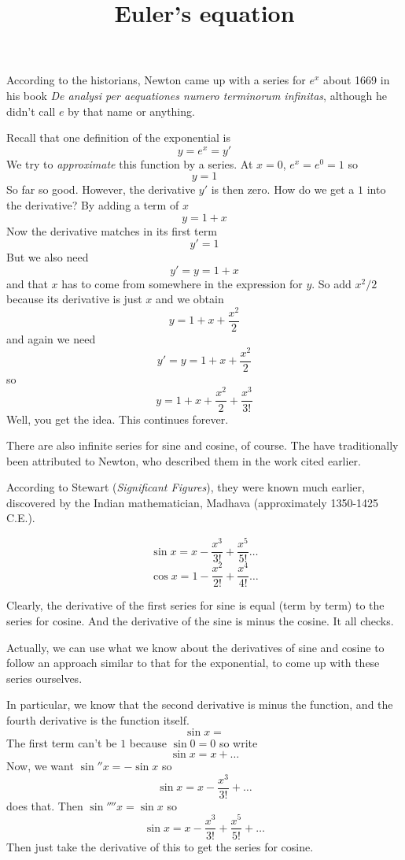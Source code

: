 \documentclass[11pt, oneside]{article}
\title{Euler's equation}
\date{}
\begin{document}
\maketitle
\Large


\label{sec:Euler_quickly}
According to the historians, Newton came up with a series for $e^x$ about 1669 in his book \emph{De analysi per aequationes numero terminorum infinitas}, although he didn't call $e$ by that name or anything.

Recall that one definition of the exponential is
\[ y = e^x = y'  \]
We try to \emph{approximate} this function by a series.  At $x = 0$, $e^x = e^0 = 1$ so
\[ y = 1 \]
So far so good.  However, the derivative $y'$ is then zero.  How do we get a $1$ into the derivative?  By adding a term of $x$
\[ y = 1 + x \]
Now the derivative matches in its first term
\[ y' = 1 \]
But we also need 
\[ y' = y = 1 + x \]
and that $x$ has to come from somewhere in the expression for $y$.  So add $x^2/2$ because its derivative is just $x$ and we obtain
\[ y = 1 + x + \frac{x^2}{2} \]
and again we need 
\[ y' = y = 1 + x + \frac{x^2}{2} \]
so
\[ y = 1 + x + \frac{x^2}{2} + \frac{x^3}{3!} \]
Well, you get the idea.  This continues forever.

There are also infinite series for sine and cosine, of course.  The have traditionally been attributed to Newton, who described them in the work cited earlier.

According to Stewart (\emph{Significant Figures}), they were known much earlier, discovered by the Indian mathematician, Madhava (approximately 1350-1425 C.E.).

\[ \sin x = x - \frac{x^3}{3!} + \frac{x^5}{5!} \dots \]
\[ \cos x = 1 - \frac{x^2}{2!} + \frac{x^4}{4!} \dots \]

Clearly, the derivative of the first series for sine is equal (term by term) to the series for cosine.  And the derivative of the sine is minus the cosine.  It all checks.

Actually, we can use what we know about the derivatives of sine and cosine to follow an approach similar to that for the exponential, to come up with these series ourselves. 

In particular, we know that the second derivative is minus the function, and the fourth derivative is the function itself.
\[ \sin x = \]
The first term can't be $1$ because $\sin 0 = 0$ so write
\[ \sin x = x + \dots \]
Now, we want $\sin'' x = - \sin x$ so
\[ \sin x = x - \frac{x^3}{3!} + \dots \]
does that.  Then $\sin'''' x = \sin x$ so
\[ \sin x = x - \frac{x^3}{3!} + \frac{x^5}{5!} + \dots \]
Then just take the derivative of this to get the series for cosine.
\end{document}
